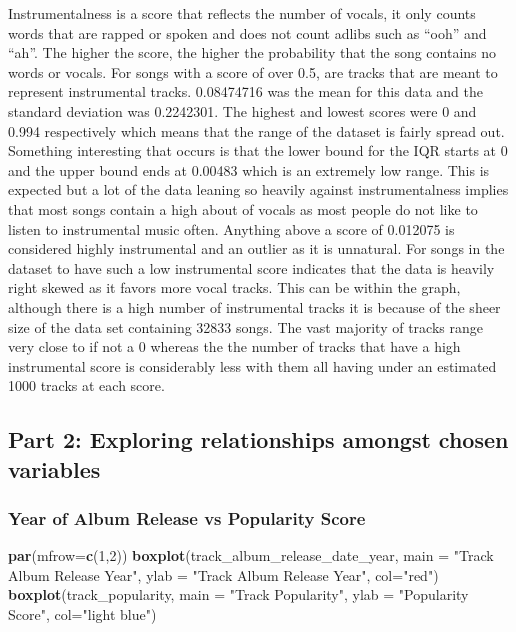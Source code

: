 \documentclass[
]{article}
\newenvironment{Shaded}{\begin{snugshade}}{\end{snugshade}}
\newcommand{\DataTypeTok}[1]{\textcolor[rgb]{0.13,0.29,0.53}{#1}}
\newcommand{\DecValTok}[1]{\textcolor[rgb]{0.00,0.00,0.81}{#1}}
\newcommand{\KeywordTok}[1]{\textcolor[rgb]{0.13,0.29,0.53}{\textbf{#1}}}
\newcommand{\NormalTok}[1]{#1}
\newcommand{\StringTok}[1]{\textcolor[rgb]{0.31,0.60,0.02}{#1}}
\begin{document}
Instrumentalness is a score that reflects the number of vocals, it only
counts words that are rapped or spoken and does not count adlibs such as
``ooh'' and ``ah''. The higher the score, the higher the probability
that the song contains no words or vocals. For songs with a score of
over 0.5, are tracks that are meant to represent instrumental tracks.
0.08474716 was the mean for this data and the standard deviation was
0.2242301. The highest and lowest scores were 0 and 0.994 respectively
which means that the range of the dataset is fairly spread out.
Something interesting that occurs is that the lower bound for the IQR
starts at 0 and the upper bound ends at 0.00483 which is an extremely
low range. This is expected but a lot of the data leaning so heavily
against instrumentalness implies that most songs contain a high about of
vocals as most people do not like to listen to instrumental music often.
Anything above a score of 0.012075 is considered highly instrumental and
an outlier as it is unnatural. For songs in the dataset to have such a
low instrumental score indicates that the data is heavily right skewed
as it favors more vocal tracks. This can be within the graph, although
there is a high number of instrumental tracks it is because of the sheer
size of the data set containing 32833 songs. The vast majority of tracks
range very close to if not a 0 whereas the the number of tracks that
have a high instrumental score is considerably less with them all having
under an estimated 1000 tracks at each score.

\hypertarget{part-2-exploring-relationships-amongst-chosen-variables}{%
\subsection{Part 2: Exploring relationships amongst chosen
variables}\label{part-2-exploring-relationships-amongst-chosen-variables}}

\hypertarget{year-of-album-release-vs-popularity-score}{%
\subsubsection{Year of Album Release vs Popularity
Score}\label{year-of-album-release-vs-popularity-score}}

\begin{Shaded}
\begin{Highlighting}[]
\KeywordTok{par}\NormalTok{(}\DataTypeTok{mfrow=}\KeywordTok{c}\NormalTok{(}\DecValTok{1}\NormalTok{,}\DecValTok{2}\NormalTok{))}
\KeywordTok{boxplot}\NormalTok{(track_album_release_date_year, }\DataTypeTok{main =} \StringTok{"Track Album Release Year"}\NormalTok{, }\DataTypeTok{ylab =} \StringTok{"Track Album Release Year"}\NormalTok{, }\DataTypeTok{col=}\StringTok{"red"}\NormalTok{)}
\KeywordTok{boxplot}\NormalTok{(track_popularity, }\DataTypeTok{main =} \StringTok{"Track Popularity"}\NormalTok{, }\DataTypeTok{ylab =} \StringTok{"Popularity Score"}\NormalTok{, }\DataTypeTok{col=}\StringTok{"light blue"}\NormalTok{)}
\end{Highlighting}
\end{Shaded}
\end{document}
